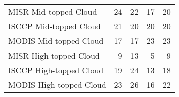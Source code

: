 \begin{tabular}{lrrrr}
   MISR Mid-topped Cloud &                       24 &                       22 &                       17 &                       20 \\
  ISCCP Mid-topped Cloud &                       21 &                       20 &                       20 &                       20 \\
  MODIS Mid-topped Cloud &                       17 &                       17 &                       23 &                       23 \\
  MISR High-topped Cloud &                        9 &                       13 &                        5 &                        9 \\
 ISCCP High-topped Cloud &                       19 &                       24 &                       13 &                       18 \\
 MODIS High-topped Cloud &                       23 &                       26 &                       16 &                       22 \\ \hline
\end{tabular}

